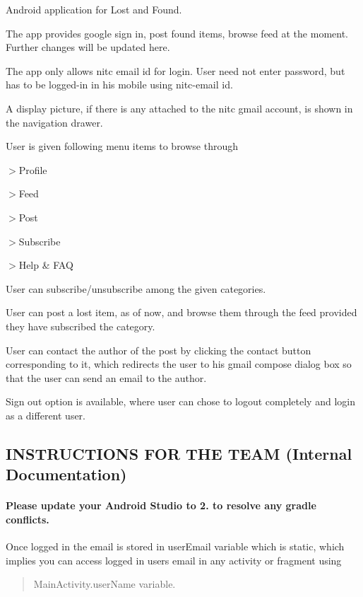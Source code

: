 Android application for Lost and Found.

The app provides google sign in, post found items, browse feed at the moment. Further changes will be updated here.


\begin{DoxyEnumerate}
\item The app only allows nitc email id for login. User need not enter password, but has to be logged-\/in in his mobile using nitc-\/email id.
\item A display picture, if there is any attached to the nitc gmail account, is shown in the navigation drawer.
\item User is given following menu items to browse through

$>$Profile

$>$Feed

$>$Post

$>$Subscribe

$>$Help \& F\+AQ
\item User can subscribe/unsubscribe among the given categories.
\item User can post a lost item, as of now, and browse them through the feed provided they have subscribed the category.
\item User can contact the author of the post by clicking the contact button corresponding to it, which redirects the user to his gmail compose dialog box so that the user can send an email to the author.
\item Sign out option is available, where user can chose to logout completely and login as a different user.
\end{DoxyEnumerate}

\subsection*{I\+N\+S\+T\+R\+U\+C\+T\+I\+O\+NS F\+OR T\+HE T\+E\+AM (Internal Documentation)}

\paragraph*{Please update your Android Studio to 2. to resolve any gradle conflicts.}

Once logged in the email is stored in user\+Email variable which is static, which implies you can access logged in users email in any activity or fragment using \begin{quote}
Main\+Activity.\+user\+Name variable. \end{quote}


